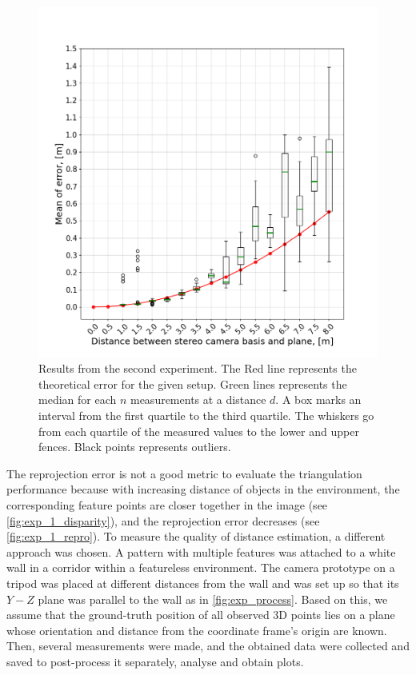 \begin{figure}[ht]
    \centering
    \includegraphics[width=\textwidth]{graphics/experiment_2_general.png}
    \caption[Results from the second experiment.]{Results from the second experiment.
    The Red line represents the theoretical error for the given setup.
        Green lines represents the median for each $n$ measurements at a distance $d$. 
        A box marks an interval from the first quartile to the third quartile.
        The whiskers go from each quartile of the measured values to the lower and upper fences.
        Black points represents outliers.
    }
    \label{fig:exp_2_general}
\end{figure}

The reprojection error is not a good metric to evaluate the triangulation performance because with increasing distance of objects in the environment, the corresponding feature points are closer together in the image (see \autoref{fig:exp_1_disparity}), and the reprojection error decreases (see \autoref{fig:exp_1_repro}).
To measure the quality of distance estimation, a different approach was chosen.
A pattern with multiple features was attached to a white wall in a corridor within a featureless environment.
The camera prototype on a tripod was placed at different distances from the wall and was set up so that its $Y-Z$ plane was parallel to the wall as in \autoref{fig:exp_process}.
Based on this, we assume that the ground-truth position of all observed 3D points lies on a plane whose orientation and distance from the coordinate frame's origin are known.
Then, several measurements were made, and the obtained data were collected and saved to post-process it separately, analyse and obtain plots.

